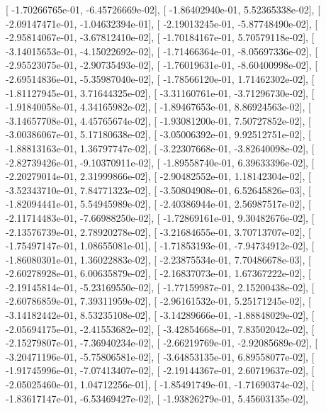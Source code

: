 \documentclass{article}
\begin{document}
       [ -1.70266765e-01,  -6.45726669e-02],
       [ -1.86402940e-01,   5.52365338e-02],
       [ -2.09147471e-01,  -1.04632394e-01],
       [ -2.19013245e-01,  -5.87748490e-02],
       [ -2.95814067e-01,  -3.67812410e-02],
       [ -1.70184167e-01,   5.70579118e-02],
       [ -3.14015653e-01,  -4.15022692e-02],
       [ -1.71466364e-01,  -8.05697336e-02],
       [ -2.95523075e-01,  -2.90735493e-02],
       [ -1.76019631e-01,  -8.60400998e-02],
       [ -2.69514836e-01,  -5.35987040e-02],
       [ -1.78566120e-01,   1.71462302e-02],
       [ -1.81127945e-01,   3.71644325e-02],
       [ -3.31160761e-01,  -3.71296730e-02],
       [ -1.91840058e-01,   4.34165982e-02],
       [ -1.89467653e-01,   8.86924563e-02],
       [ -3.14657708e-01,   4.45765674e-02],
       [ -1.93081200e-01,   7.50727852e-02],
       [ -3.00386067e-01,   5.17180638e-02],
       [ -3.05006392e-01,   9.92512751e-02],
       [ -1.88813163e-01,   1.36797747e-02],
       [ -3.22307668e-01,  -3.82640098e-02],
       [ -2.82739426e-01,  -9.10370911e-02],
       [ -1.89558740e-01,   6.39633396e-02],
       [ -2.20279014e-01,   2.31999866e-02],
       [ -2.90482552e-01,   1.18142304e-02],
       [ -3.52343710e-01,   7.84771323e-02],
       [ -3.50804908e-01,   6.52645826e-03],
       [ -1.82094441e-01,   5.54945989e-02],
       [ -2.40386944e-01,   2.56987517e-02],
       [ -2.11714483e-01,  -7.66988250e-02],
       [ -1.72869161e-01,   9.30482676e-02],
       [ -2.13576739e-01,   2.78920278e-02],
       [ -3.21684655e-01,   3.70713707e-02],
       [ -1.75497147e-01,   1.08655081e-01],
       [ -1.71853193e-01,  -7.94734912e-02],
       [ -1.86080301e-01,   1.36022883e-02],
       [ -2.23875534e-01,   7.70486678e-03],
       [ -2.60278928e-01,   6.00635879e-02],
       [ -2.16837073e-01,   1.67367222e-02],
       [ -2.19145814e-01,  -5.23169550e-02],
       [ -1.77159987e-01,   2.15200438e-02],
       [ -2.60786859e-01,   7.39311959e-02],
       [ -2.96161532e-01,   5.25171245e-02],
       [ -3.14182442e-01,   8.53235108e-02],
       [ -3.14289666e-01,  -1.88848029e-02],
       [ -2.05694175e-01,  -2.41553682e-02],
       [ -3.42854668e-01,   7.83502042e-02],
       [ -2.15279807e-01,  -7.36940234e-02],
       [ -2.66219769e-01,  -2.92085689e-02],
       [ -3.20471196e-01,  -5.75806581e-02],
       [ -3.64853135e-01,   6.89558077e-02],
       [ -1.91745996e-01,  -7.07413407e-02],
       [ -2.19144367e-01,   2.60719637e-02],
       [ -2.05025460e-01,   1.04712256e-01],
       [ -1.85491749e-01,  -1.71690374e-02],
       [ -1.83617147e-01,  -6.53469427e-02],
       [ -1.93826279e-01,   5.45603135e-02],
\end{document}
